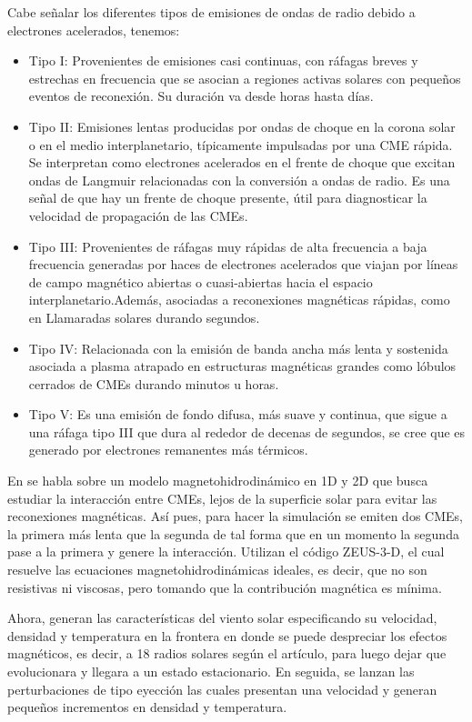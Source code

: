 Cabe señalar los diferentes tipos de emisiones de ondas de radio debido a electrones acelerados, tenemos:
\begin{itemize}
    \item Tipo I: Provenientes de emisiones casi continuas, con ráfagas breves y estrechas en frecuencia que se asocian a regiones activas solares con pequeños eventos de reconexión. Su duración va desde horas hasta días.
    \item Tipo II: Emisiones lentas producidas por ondas de choque en la corona solar o en el medio interplanetario, típicamente impulsadas por una \ac{CME} rápida. Se interpretan como electrones acelerados en el frente de choque que excitan ondas de Langmuir relacionadas con la conversión a ondas de radio. %
    Es una señal de que hay un frente de choque presente, útil para diagnosticar la velocidad de propagación de las CMEs.
    \item Tipo III: Provenientes de ráfagas muy rápidas de alta frecuencia a baja frecuencia generadas por haces de electrones acelerados que viajan por líneas de campo magnético abiertas o cuasi-abiertas hacia el espacio interplanetario.Además, asociadas a reconexiones magnéticas rápidas, como en Llamaradas solares durando segundos.
    \item Tipo IV: Relacionada con la emisión de banda ancha más lenta y sostenida asociada a plasma atrapado en estructuras magnéticas grandes como lóbulos cerrados de \acp{CME} durando minutos u horas.
    \item Tipo V: Es una emisión de fondo difusa, más suave y continua, que sigue a una ráfaga tipo III que dura al rededor de decenas de segundos, se cree que es generado por electrones remanentes más térmicos.
\end{itemize}

En \cite{gonzalez-esparza-2004} se habla sobre un modelo magnetohidrodinámico en 1D y 2D que busca estudiar la interacción entre CMEs, lejos de la superficie solar para evitar las reconexiones magnéticas. Así pues, para hacer la simulación se emiten dos CMEs, la primera más lenta que la segunda de tal forma que en un momento la segunda pase a la primera y genere la interacción. Utilizan el código ZEUS-3-D, el cual resuelve las ecuaciones magnetohidrodinámicas ideales, es decir, que no son resistivas ni viscosas, pero tomando que la contribución magnética es mínima.

Ahora, generan las características del viento solar especificando su velocidad, densidad y temperatura en la frontera en donde se puede despreciar los efectos magnéticos, es decir, a 18 radios solares según el artículo, para luego dejar que evolucionara y llegara a un estado estacionario. En seguida, se lanzan las perturbaciones de tipo eyección las cuales presentan una velocidad y generan pequeños incrementos en densidad y temperatura.

